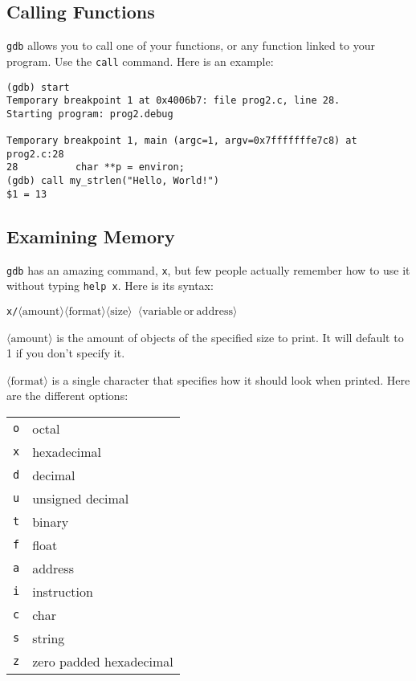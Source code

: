 \documentclass[11pt]{article}
\begin{document}
\subsection{Calling Functions}
\texttt{gdb} allows you to call one of your functions, or any function linked
to your program. Use the \texttt{call} command. Here is an example:

\begin{termbox}
\begin{verbatim}
(gdb) start
Temporary breakpoint 1 at 0x4006b7: file prog2.c, line 28.
Starting program: prog2.debug

Temporary breakpoint 1, main (argc=1, argv=0x7fffffffe7c8) at prog2.c:28
28          char **p = environ;
(gdb) call my_strlen("Hello, World!")
$1 = 13
\end{verbatim}
\end{termbox}

\subsection{Examining Memory}
\texttt{gdb} has an amazing command, \texttt{x}, but few people actually remember how
to use it without typing \texttt{help x}. Here is its syntax:

\begin{center}
    \texttt{x/$\langle\mathrm{amount}\rangle\langle\mathrm{format}\rangle\langle\mathrm{size}\rangle$
    $\langle\mathrm{variable\ or\ address}\rangle$}
\end{center}

$\langle\mathrm{amount}\rangle$ is the amount of objects of the specified size
to print. It will default to 1 if you don't specify it.

$\langle\mathrm{format}\rangle$ is a single character that specifies how it
should look when printed. Here are the different options:

\begin{tabular}{l l}
    \texttt{o} & octal \\
    \texttt{x} & hexadecimal \\
    \texttt{d} & decimal \\
    \texttt{u} & unsigned decimal \\
    \texttt{t} & binary \\
    \texttt{f} & float \\
    \texttt{a} & address \\
    \texttt{i} & instruction \\
    \texttt{c} & char \\
    \texttt{s} & string \\
    \texttt{z} & zero padded hexadecimal \\
\end{tabular}
\end{document}
